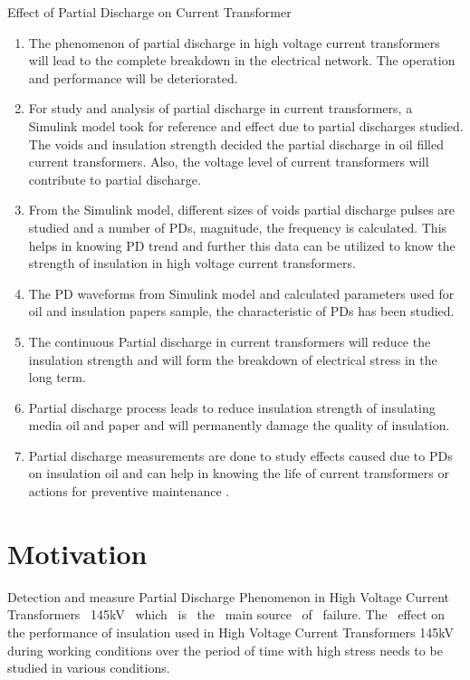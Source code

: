 \clearpage 
Effect of Partial Discharge on Current Transformer
\begin{enumerate}


\item The phenomenon of partial discharge in high voltage current transformers will lead to the complete breakdown in the electrical network. The operation and performance will be deteriorated.

\item For study and analysis of partial discharge in current transformers, a Simulink model took for reference and effect due to partial discharges studied. The voids and insulation strength decided the partial discharge in oil filled current transformers. Also, the voltage level of current transformers will contribute to partial discharge.

\item From the Simulink model, different sizes of voids partial discharge pulses are studied and a number of PDs, magnitude, the frequency is calculated. This helps in knowing PD trend and further this data can be utilized to know the strength of insulation in high voltage current transformers.

\item The PD waveforms from Simulink model and calculated parameters used for oil and insulation papers sample, the characteristic of PDs has been studied.

\item The continuous Partial discharge in current transformers will reduce the insulation strength and will form the breakdown of electrical stress in the long term.

\item Partial discharge process leads to reduce insulation strength of insulating media oil and paper and will permanently damage the quality of insulation.

\item Partial discharge measurements are done to study effects caused due to PDs on insulation oil and can help in knowing the life of current transformers or actions for preventive maintenance \cite{gutfleisch1995measurement, bartnikas2002partial, karmakar2009partial}.

\end{enumerate}

\pagebreak 
\section{Motivation}
Detection and measure Partial Discharge Phenomenon in High Voltage Current Transformers ~145kV ~which ~is ~the ~main source ~of ~failure. The ~effect on the performance of insulation used in High Voltage Current Transformers 145kV during working conditions over the period of time with high stress needs to be studied in various conditions.\setlength{\parskip}{1em}

